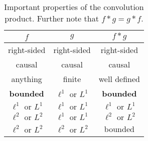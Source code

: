 \begin{table}
	\centering
	\begin{tabular}{ccc}
		\toprule
		$f$                    & $g$                    & $f * g$                \\
		\midrule
		right-sided            & right-sided            & right-sided            \\
		causal                 & causal                 & causal                 \\
		anything               & finite                 & well defined           \\
		\midrule
		\bfseries bounded      & $\ell^1\text{ or }L^1$ & \bfseries bounded      \\
		$\ell^1\text{ or }L^1$ & $\ell^1\text{ or }L^1$ & $\ell^1\text{ or }L^1$ \\
		\midrule
		$\ell^2\text{ or }L^2$ & $\ell^1\text{ or }L^1$ & $\ell^2\text{ or }L^2$ \\
		$\ell^2\text{ or }L^2$ & $\ell^2\text{ or }L^2$ & bounded                \\
		\bottomrule
	\end{tabular}
	\caption{
		Important properties of the convolution product. Further note that $f * g
		= g * f$.
	}
\end{table}
